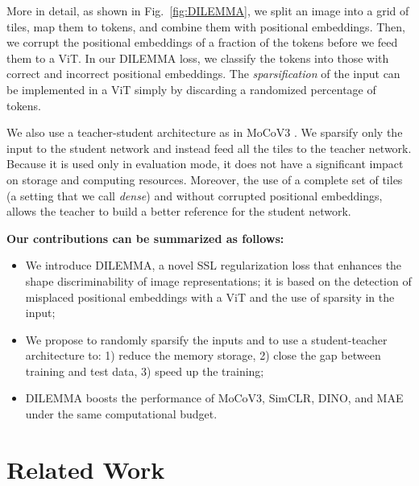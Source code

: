 \documentclass[letterpaper]{article} \usepackage{aaai23}  \usepackage{times}  \usepackage{helvet}  \usepackage{courier}  \usepackage[hyphens]{url}  \usepackage{graphicx} \urlstyle{rm} \def\UrlFont{\rm}  \usepackage{natbib}  \usepackage{caption} \frenchspacing  \setlength{\pdfpagewidth}{8.5in}  \setlength{\pdfpageheight}{11in}  \usepackage{algorithm}
\newcommand{\methodname}{DILEMMA}
\begin{document}
More in detail, as shown in Fig.~\ref{fig:DILEMMA}, we split an image into a grid of tiles, map them to tokens, and combine them with positional embeddings. Then, we corrupt the positional embeddings of a fraction of the tokens before we feed them to a ViT. In our {\methodname} loss, we classify the tokens into those with correct and incorrect positional embeddings. 
The \emph{sparsification} of the input can be implemented in a ViT simply by discarding a randomized percentage of tokens.

We also use a teacher-student architecture as in MoCoV3 \cite{chen2021empirical}. We sparsify only the input to the student network and instead feed all the tiles to the teacher network. Because it is used only in evaluation mode, it does not have a significant impact on storage and computing resources. Moreover, the use of a complete set of tiles (a setting that we call \emph{dense}) and without corrupted positional embeddings, allows the teacher to build a better reference for the student network.

\noindent\textbf{Our contributions can be summarized as follows:}
\begin{itemize}
\item We introduce {\methodname}, a novel SSL regularization loss that enhances the shape discriminability of image representations; it is based on the detection of misplaced positional embeddings with a ViT and the use of sparsity in the input;
\item We propose to randomly sparsify the inputs and to use a student-teacher architecture to: 1) reduce the memory storage, 2) close the gap between training and test data, 3) speed up the training; 
\item {\methodname} boosts the performance of MoCoV3, SimCLR, DINO, and MAE under the same computational budget.
\end{itemize}

\section{Related Work}
\end{document}
